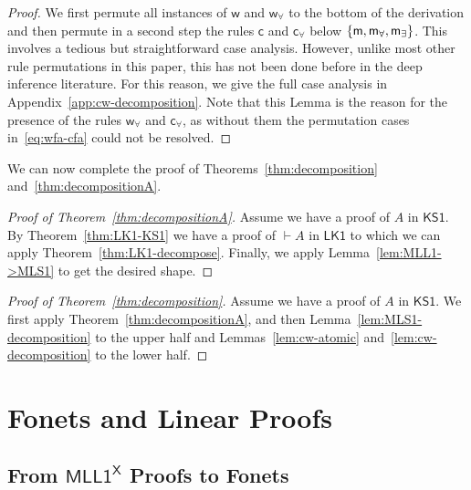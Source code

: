 \documentclass[conference,twosided,10pt]{IEEEtran}
\newcommand{\todo}[1]{{\color{red}     \noindent[\![\![{\bf TODO: }#1]\!]\!]}}
\theoremstyle{definition}
\newcommand*{\FOLK}{\mathsf{LK1}}
\newcommand*{\FOMLL}{\mathsf{MLL1^X}}
\newcommand*{\FOKS}{\mathsf{KS1}}
\renewcommand\wD {\mathsf{w}}
\renewcommand\cD {\mathsf{c}}
\newcommand\wfaD {\mathsf{w_\forall}}
\newcommand\cfaD {\mathsf{c_\forall}}
\newcommand\mfaD {\mathsf{m_\forall}}
\newcommand\mexD {\mathsf{m_\exists}}
\newcommand{\set}[1]{\{#1\}}
\newcommand{\sqn}[1]{\vdash#1}
\begin{document}
\begin{proof}
  We first permute all instances of $\wD$ and $\wfaD$ to the bottom of
  the derivation and then permute in a second step the rules $\cD$ and
  $\cfaD$ below $\set{\me,\mfaD,\mexD}$. This involves a tedious but
  straightforward case analysis. However, unlike most other rule
  permutations in this paper, this has not been done before in the deep
  inference literature. For this reason, we give the full case
  analysis in Appendix~\ref{app:cw-decomposition}. Note that this
  Lemma is the reason for the presence of the rules $\wfaD$ and
  $\cfaD$, as without them the permutation cases in~\eqref{eq:wfa-cfa}
  could not be resolved.
\end{proof}

We can now complete the proof of Theorems~\ref{thm:decomposition} and~\ref{thm:decompositionA}.

\begin{proof}[Proof of Theorem~\ref{thm:decompositionA}]
  Assume we have a proof of $A$ in $\FOKS$. By
  Theorem~\ref{thm:LK1-KS1} we have a proof of $\sqn A$ in $\FOLK$ to
  which we can apply Theorem~\ref{thm:LK1-decompose}. Finally, we
  apply Lemma~\ref{lem:MLL1->MLS1} to get the desired shape.
\end{proof}

\begin{proof}[Proof of Theorem~\ref{thm:decomposition}]
  Assume we have a proof of $A$ in $\FOKS$. We first apply
  Theorem~\ref{thm:decompositionA}, and then
  Lemma~\ref{lem:MLS1-decomposition} to the upper half and
  Lemmas~\ref{lem:cw-atomic} and~\ref{lem:cw-decomposition} to the lower half.
\end{proof}


\section{Fonets and Linear Proofs}
\label{sec:linear}


\subsection{From $\FOMLL$ Proofs to Fonets}
\end{document}
